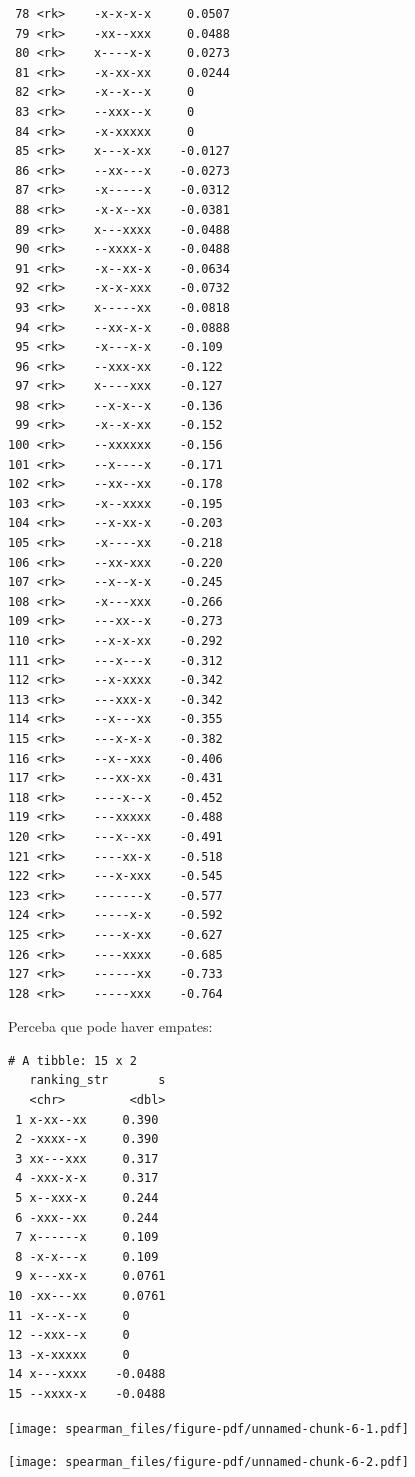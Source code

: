 \documentclass[
  letterpaper,
  DIV=11,
  numbers=noendperiod]{scrreprt}
\begin{document}
\begin{verbatim}
 78 <rk>    -x-x-x-x     0.0507
 79 <rk>    -xx--xxx     0.0488
 80 <rk>    x----x-x     0.0273
 81 <rk>    -x-xx-xx     0.0244
 82 <rk>    -x--x--x     0     
 83 <rk>    --xxx--x     0     
 84 <rk>    -x-xxxxx     0     
 85 <rk>    x---x-xx    -0.0127
 86 <rk>    --xx---x    -0.0273
 87 <rk>    -x-----x    -0.0312
 88 <rk>    -x-x--xx    -0.0381
 89 <rk>    x---xxxx    -0.0488
 90 <rk>    --xxxx-x    -0.0488
 91 <rk>    -x--xx-x    -0.0634
 92 <rk>    -x-x-xxx    -0.0732
 93 <rk>    x-----xx    -0.0818
 94 <rk>    --xx-x-x    -0.0888
 95 <rk>    -x---x-x    -0.109 
 96 <rk>    --xxx-xx    -0.122 
 97 <rk>    x----xxx    -0.127 
 98 <rk>    --x-x--x    -0.136 
 99 <rk>    -x--x-xx    -0.152 
100 <rk>    --xxxxxx    -0.156 
101 <rk>    --x----x    -0.171 
102 <rk>    --xx--xx    -0.178 
103 <rk>    -x--xxxx    -0.195 
104 <rk>    --x-xx-x    -0.203 
105 <rk>    -x----xx    -0.218 
106 <rk>    --xx-xxx    -0.220 
107 <rk>    --x--x-x    -0.245 
108 <rk>    -x---xxx    -0.266 
109 <rk>    ---xx--x    -0.273 
110 <rk>    --x-x-xx    -0.292 
111 <rk>    ---x---x    -0.312 
112 <rk>    --x-xxxx    -0.342 
113 <rk>    ---xxx-x    -0.342 
114 <rk>    --x---xx    -0.355 
115 <rk>    ---x-x-x    -0.382 
116 <rk>    --x--xxx    -0.406 
117 <rk>    ---xx-xx    -0.431 
118 <rk>    ----x--x    -0.452 
119 <rk>    ---xxxxx    -0.488 
120 <rk>    ---x--xx    -0.491 
121 <rk>    ----xx-x    -0.518 
122 <rk>    ---x-xxx    -0.545 
123 <rk>    -------x    -0.577 
124 <rk>    -----x-x    -0.592 
125 <rk>    ----x-xx    -0.627 
126 <rk>    ----xxxx    -0.685 
127 <rk>    ------xx    -0.733 
128 <rk>    -----xxx    -0.764 
\end{verbatim}

Perceba que pode haver empates:

\begin{verbatim}
# A tibble: 15 x 2
   ranking_str       s
   <chr>         <dbl>
 1 x-xx--xx     0.390 
 2 -xxxx--x     0.390 
 3 xx---xxx     0.317 
 4 -xxx-x-x     0.317 
 5 x--xxx-x     0.244 
 6 -xxx--xx     0.244 
 7 x------x     0.109 
 8 -x-x---x     0.109 
 9 x---xx-x     0.0761
10 -xx---xx     0.0761
11 -x--x--x     0     
12 --xxx--x     0     
13 -x-xxxxx     0     
14 x---xxxx    -0.0488
15 --xxxx-x    -0.0488
\end{verbatim}

\begin{center}
\texttt{[image: spearman\_files/figure-pdf/unnamed-chunk-6-1.pdf]}
\end{center}

\begin{center}
\texttt{[image: spearman\_files/figure-pdf/unnamed-chunk-6-2.pdf]}
\end{center}
\end{document}
